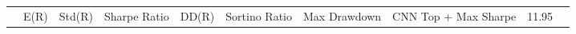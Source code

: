 \begin{tabular}{lrrrrrrrrr}
 & E(R) & Std(R) & Sharpe Ratio & DD(R) & Sortino Ratio & Max Drawdown & %
CNN Top + Max Sharpe & 11.95%
\end{tabular}
